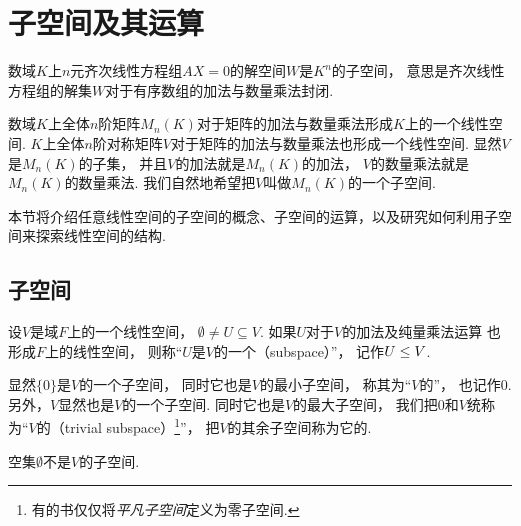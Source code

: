 \section{子空间及其运算}
数域\(K\)上\(n\)元齐次线性方程组\(A X = 0\)的解空间\(W\)是\(K^n\)的子空间，
意思是齐次线性方程组的解集\(W\)对于有序数组的加法与数量乘法封闭.

数域\(K\)上全体\(n\)阶矩阵\(M_n(K)\)对于矩阵的加法与数量乘法形成\(K\)上的一个线性空间.
\(K\)上全体\(n\)阶对称矩阵\(V\)对于矩阵的加法与数量乘法也形成一个线性空间.
显然\(V\)是\(M_n(K)\)的子集，
并且\(V\)的加法就是\(M_n(K)\)的加法，
\(V\)的数量乘法就是\(M_n(K)\)的数量乘法.
我们自然地希望把\(V\)叫做\(M_n(K)\)的一个子空间.

本节将介绍任意线性空间的子空间的概念、子空间的运算，以及研究如何利用子空间来探索线性空间的结构.

\subsection{子空间}
\begin{definition}
设\(V\)是域\(F\)上的一个线性空间，
\(\emptyset\neq U\subseteq V\).
如果\(U\)对于\(V\)的加法及纯量乘法运算
也形成\(F\)上的线性空间，
则称“\(U\)是\(V\)的一个（subspace）”，
记作\(U \leq V\).
\end{definition}

显然\(\{0\}\)是\(V\)的一个子空间，
同时它也是\(V\)的最小子空间，
称其为“\(V\)的”，
也记作\(0\).
另外，\(V\)显然也是\(V\)的一个子空间.
同时它也是\(V\)的最大子空间，
我们把\(0\)和\(V\)统称为“\(V\)的（trivial subspace）\footnote{
	有的书仅仅将\emph{平凡子空间}定义为零子空间.
}”，
把\(V\)的其余子空间称为它的.

空集\(\emptyset\)不是\(V\)的子空间.

